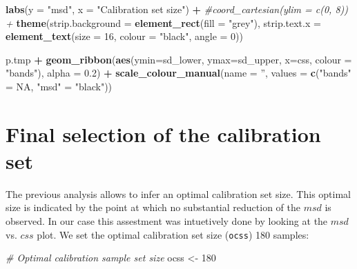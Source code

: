 \documentclass[]{book}
\newenvironment{Shaded}{\begin{snugshade}}{\end{snugshade}}
\newcommand{\CommentTok}[1]{\textcolor[rgb]{0.56,0.35,0.01}{\textit{#1}}}
\newcommand{\DataTypeTok}[1]{\textcolor[rgb]{0.13,0.29,0.53}{#1}}
\newcommand{\DecValTok}[1]{\textcolor[rgb]{0.00,0.00,0.81}{#1}}
\newcommand{\FloatTok}[1]{\textcolor[rgb]{0.00,0.00,0.81}{#1}}
\newcommand{\KeywordTok}[1]{\textcolor[rgb]{0.13,0.29,0.53}{\textbf{#1}}}
\newcommand{\NormalTok}[1]{#1}
\newcommand{\OperatorTok}[1]{\textcolor[rgb]{0.81,0.36,0.00}{\textbf{#1}}}
\newcommand{\OtherTok}[1]{\textcolor[rgb]{0.56,0.35,0.01}{#1}}
\newcommand{\StringTok}[1]{\textcolor[rgb]{0.31,0.60,0.02}{#1}}
\begin{document}
\begin{Shaded}
\begin{Highlighting}[]
\StringTok{  }\KeywordTok{labs}\NormalTok{(}\DataTypeTok{y =} \StringTok{"msd"}\NormalTok{, }\DataTypeTok{x =} \StringTok{"Calibration set size"}\NormalTok{) }\OperatorTok{+}
\StringTok{  }\CommentTok{#coord_cartesian(ylim = c(0, 8)) + }
\StringTok{  }\KeywordTok{theme}\NormalTok{(}\DataTypeTok{strip.background =} \KeywordTok{element_rect}\NormalTok{(}\DataTypeTok{fill =} \StringTok{"grey"}\NormalTok{), }
        \DataTypeTok{strip.text.x =} \KeywordTok{element_text}\NormalTok{(}\DataTypeTok{size =} \DecValTok{16}\NormalTok{, }\DataTypeTok{colour =} \StringTok{"black"}\NormalTok{, }\DataTypeTok{angle =} \DecValTok{0}\NormalTok{)) }
        
\NormalTok{p.tmp }\OperatorTok{+}\StringTok{ }
\StringTok{  }\KeywordTok{geom_ribbon}\NormalTok{(}\KeywordTok{aes}\NormalTok{(}\DataTypeTok{ymin=}\NormalTok{sd_lower, }\DataTypeTok{ymax=}\NormalTok{sd_upper, }\DataTypeTok{x=}\NormalTok{css, }\DataTypeTok{colour =} \StringTok{"bands"}\NormalTok{), }\DataTypeTok{alpha =} \FloatTok{0.2}\NormalTok{) }\OperatorTok{+}
\StringTok{  }\KeywordTok{scale_colour_manual}\NormalTok{(}\DataTypeTok{name =} \StringTok{''}\NormalTok{, }\DataTypeTok{values =} \KeywordTok{c}\NormalTok{(}\StringTok{"bands"}\NormalTok{ =}\StringTok{ }\OtherTok{NA}\NormalTok{, }\StringTok{"msd"}\NormalTok{ =}\StringTok{ "black"}\NormalTok{))}
\end{Highlighting}
\end{Shaded}

\hypertarget{final-selection-of-the-calibration-set}{%
\section{Final selection of the calibration set}\label{final-selection-of-the-calibration-set}}

The previous analysis allows to infer an optimal calibration set size. This optimal size is indicated by the point at which no substantial reduction of the \(msd\) is observed. In our case this assestment was intuetively done by looking at the \(msd\) vs. \(css\) plot. We set the optimal calibration set size (\texttt{ocss}) 180 samples:

\begin{Shaded}
\begin{Highlighting}[]
\CommentTok{# Optimal calibration sample set size}
\NormalTok{ocss <-}\StringTok{ }\DecValTok{180}
\end{Highlighting}
\end{Shaded}
\end{document}
